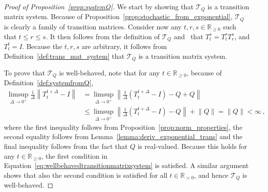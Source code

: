 \documentclass[10pt,a4paper]{paper}
\theoremstyle{definition}
\newcommand{\reals}{\mathbb{R}}
\newcommand{\realspos}{\reals_{>0}}
\newcommand{\realsnonneg}{\reals_{\geq 0}}
\newcommand{\norm}[1]{\left\lVert #1 \right\rVert}
\begin{document}
\begin{proof}[Proof of Proposition~\ref{prop:systemQ}]
We start by showing that $\mathcal{T}_Q$ is a transition matrix system. Because of Proposition~\ref{prop:stochastic_from_exponential}, $\mathcal{T}_Q$ is clearly a family of transition matrices. Consider now any $t,r,s\in\realsnonneg$ such that $t\leq r\leq s$. It then follows from the definition of $\mathcal{T}_Q$ and~\cite[Theorem 2.1.1]{norris1998markov} that $T_t^s=T_t^rT_r^s$, and $T_t^t=I$. Because the $t,r,s$ are arbitrary, it follows from Definition~\ref{def:trans_mat_system} that $\mathcal{T}_Q$ is a transition matrix system.

To prove that $\mathcal{T}_Q$ is well-behaved, note that for any $t\in\realsnonneg$, because of Definition~\ref{def:systemfromQ},
\begin{align*}
\limsup_{\Delta\to 0^+}\frac{1}{\Delta}\norm{T_t^{t+\Delta}-I} 
&=\limsup_{\Delta\to 0^+}\norm{\frac{1}{\Delta}(T_t^{t+\Delta}-I)-Q+Q}\\
&\leq\limsup_{\Delta\to 0^+}\norm{\frac{1}{\Delta}(T_t^{t+\Delta}-I)-Q}+\norm{Q}  
= \norm{Q} < \infty\,,
\end{align*}
where the first inequality follows from Proposition~\ref{prop:norm_properties}, the second equality follows from Lemma~\ref{lemma:deriv_exponential_trans} and the final inequality follows from the fact that $Q$ is real-valued. Because this holds for any $t\in\realsnonneg$, the first condition in Equation~\eqref{eq:wellbehavedtransitionmatrixsystem} is satisfied. A similar argument shows that also the second condition is satisfied for all $t\in\realspos$, and hence $\mathcal{T}_Q$ is well-behaved.
\end{proof}
\end{document}
